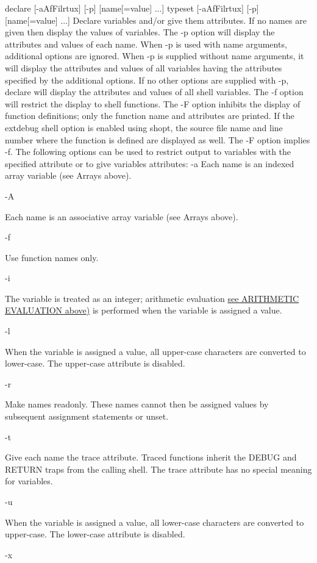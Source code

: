 declare [-aAfFilrtux] [-p] [name[=value] ...]
typeset [-aAfFilrtux] [-p] [name[=value] ...]
Declare variables and/or give them attributes. If no names are given then display the values of variables. The -p option will display the attributes and values of each name. When -p is used with name arguments, additional options are ignored. When -p is supplied without name arguments, it will display the attributes and values of all variables having the attributes specified by the additional options. If no other options are supplied with -p, declare will display the attributes and values of all shell variables. The -f option will restrict the display to shell functions. The -F option inhibits the display of function definitions; only the function name and attributes are printed. If the extdebug shell option is enabled using shopt, the source file name and line number where the function is defined are displayed as well. The -F option implies -f. The following options can be used to restrict output to variables with the specified attribute or to give variables attributes:
-a
Each name is an indexed array variable (see Arrays above).

-A

Each name is an associative array variable (see Arrays above).

-f

Use function names only.

-i

The variable is treated as an integer; arithmetic evaluation \hyperref[sec:arithmeticevaluation]{see ARITHMETIC EVALUATION above)} is performed when the variable is assigned a value.

-l

When the variable is assigned a value, all upper-case characters are converted to lower-case. The upper-case attribute is disabled.

-r

Make names readonly. These names cannot then be assigned values by subsequent assignment statements or unset.

-t

Give each name the trace attribute. Traced functions inherit the DEBUG and RETURN traps from the calling shell. The trace attribute has no special meaning for variables.

-u

When the variable is assigned a value, all lower-case characters are converted to upper-case. The lower-case attribute is disabled.

-x

